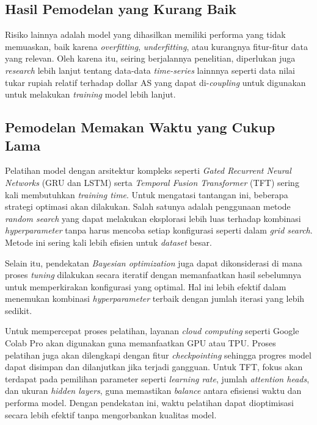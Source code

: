 \subsection{Hasil Pemodelan yang Kurang Baik}

Risiko lainnya adalah model yang dihasilkan memiliki performa yang tidak memuaskan, baik karena \textit{overfitting}, \textit{underfitting}, atau kurangnya fitur-fitur data yang relevan. Oleh karena itu, seiring berjalannya penelitian, diperlukan juga \textit{research} lebih lanjut tentang data-data \textit{time-series} lainnnya seperti data nilai tukar rupiah relatif terhadap dollar AS yang dapat di-\textit{coupling} untuk digunakan untuk melakukan \textit{training} model lebih lanjut.



\subsection{Pemodelan Memakan Waktu yang Cukup Lama}

Pelatihan model dengan arsitektur kompleks seperti \textit{Gated Recurrent Neural Networks} (GRU dan LSTM) serta \textit{Temporal Fusion Transformer} (TFT) sering kali membutuhkan \textit{training time}. Untuk mengatasi tantangan ini, beberapa strategi optimasi akan dilakukan. Salah satunya adalah penggunaan metode \textit{random search} yang dapat melakukan eksplorasi lebih luas terhadap kombinasi \textit{hyperparameter} tanpa harus mencoba setiap konfigurasi seperti dalam \textit{grid search}. Metode ini sering kali lebih efisien untuk \textit{dataset} besar.

Selain itu, pendekatan \textit{Bayesian optimization} juga dapat dikonsiderasi di mana proses \textit{tuning} dilakukan secara iteratif dengan memanfaatkan hasil sebelumnya untuk memperkirakan konfigurasi yang optimal. Hal ini lebih efektif dalam menemukan kombinasi \textit{hyperparameter} terbaik dengan jumlah iterasi yang lebih sedikit. 

Untuk mempercepat proses pelatihan, layanan \textit{cloud computing} seperti Google Colab Pro akan digunakan guna memanfaatkan GPU atau TPU. Proses pelatihan juga akan dilengkapi dengan fitur \textit{checkpointing} sehingga progres model dapat disimpan dan dilanjutkan jika terjadi gangguan. Untuk TFT, fokus akan terdapat pada pemilihan parameter seperti \textit{learning rate}, jumlah \textit{attention heads}, dan ukuran \textit{hidden layers}, guna memastikan \textit{balance} antara efisiensi waktu dan performa model. Dengan pendekatan ini, waktu pelatihan dapat dioptimisasi secara lebih efektif tanpa mengorbankan kualitas model.

